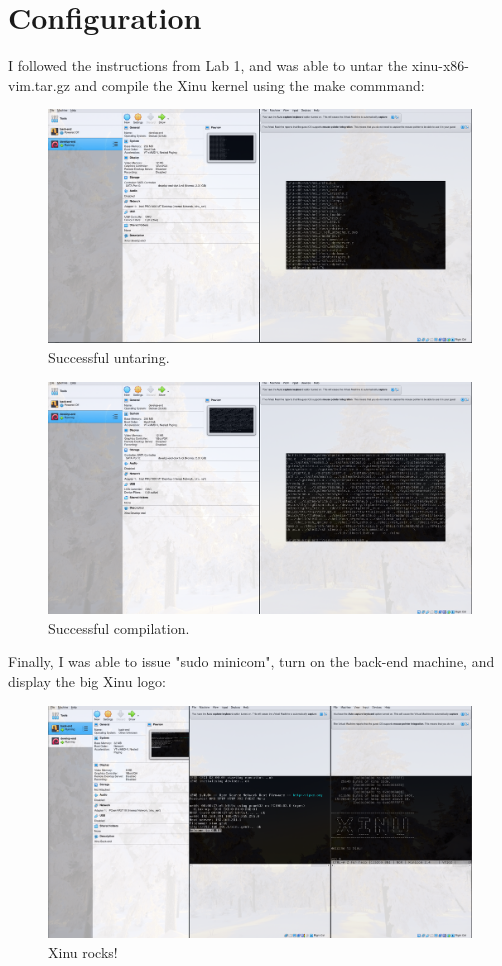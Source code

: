 \documentclass{article}
\begin{document}
\section{Configuration}
I followed the instructions from Lab 1, and was able to untar the 
xinu-x86-vim.tar.gz and compile the Xinu kernel using the make commmand:\\
\begin{figure}[ht!]
  \includegraphics[width=\textwidth]{tar.png}
  \caption{Successful untaring.}
\end{figure}
\begin{figure}[ht!]
  \includegraphics[width=\textwidth]{compile.png}
  \caption{Successful compilation.}
\end{figure}

Finally, I was able to issue "sudo minicom", turn on the back-end machine, and display the big Xinu logo:
\begin{figure}[ht!]
  \includegraphics[width=\textwidth]{xinupage.png}
  \caption{Xinu rocks!}
\end{figure}
\end{document}
